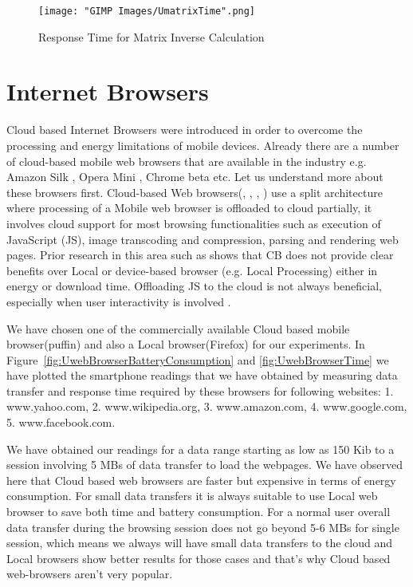\documentclass{report}
\begin{document}
\begin{figure}[h]
  \centering
  \texttt{[image: "GIMP Images/UmatrixTime".png]}
  \caption{Response Time for Matrix Inverse Calculation}
  \label{fig:UmatrixTime}
\end{figure}

\section{Internet Browsers}
Cloud based Internet Browsers were introduced in order to overcome the processing and energy limitations
of mobile devices. Already there are a number of cloud-based mobile web browsers that are available in the industry e.g. Amazon Silk \cite{AmazonSilk}, Opera Mini \cite{OperaMini}, Chrome beta \cite{ChromeBeta} etc. Let us understand more about these browsers first.
Cloud-based Web browsers(\cite{AmazonSilk}, \cite{ChromeBeta}, \cite{OperaMini}, \cite{wang2013accelerating}) use a split architecture where processing of a Mobile web
browser is offloaded to cloud partially, it involves cloud support for most browsing functionalities such as execution of JavaScript (JS), image transcoding and compression, parsing and rendering web pages.
Prior research in this area such as \cite{sivakumar2014cloud} shows that CB does not provide clear benefits over Local or device-based browser (e.g. Local Processing) either in energy or download time. Offloading JS to the cloud is not always beneficial, especially when user interactivity is involved \cite{sivakumar2014cloud}. 

We have chosen one of the commercially available Cloud based mobile browser(puffin) and also a Local browser(Firefox) for our experiments. In Figure~\ref{fig:UwebBrowserBatteryConsumption} and \ref{fig:UwebBrowserTime} we have plotted the smartphone readings that we have obtained by measuring data transfer and response time required by these browsers for following websites: 1. www.yahoo.com, 2. www.wikipedia.org, 3. www.amazon.com, 4. www.google.com, 5. www.facebook.com.

We have obtained our readings for a data range starting as low as 150 Kib to a session involving 5 MBs of data transfer to load the webpages. We have observed here that Cloud based web browsers are faster but expensive in terms of energy consumption. For small data transfers it is always suitable to use Local web browser to save both time and battery consumption. For a normal user overall data transfer during the browsing session does not go beyond 5-6 MBs for single session, which means we always will have small data transfers to the cloud and Local browsers show better results for those cases and that's why Cloud based web-browsers aren't very popular.
\end{document}
